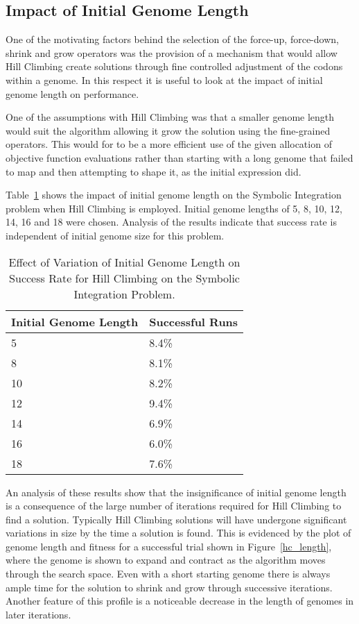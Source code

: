 \subsection{Impact of Initial Genome Length}
One of the motivating factors behind the selection of the force-up, force-down, shrink and grow operators was the provision of a mechanism that would allow Hill Climbing create solutions through fine controlled adjustment of the codons within a genome. In this respect it is useful to look at the impact of initial genome length on performance.
 
One of the assumptions with Hill Climbing was that a smaller genome length would suit the algorithm allowing it grow the solution using the fine-grained operators. This would for to be a more efficient use of the given allocation of objective function evaluations rather than starting with a long genome that failed to map and then attempting to shape it, as the initial expression did.

Table~\ref{hc_gl_table} shows the impact of initial genome length on the Symbolic Integration problem when Hill Climbing is employed. Initial genome lengths of 5, 8, 10, 12, 14, 16 and 18 were chosen. Analysis of the results indicate that success rate is independent of initial genome size for this problem. 

\begin{table}[h]
\begin{center}
\begin{tabular}{|l|l|}
\hline
Initial Genome Length & Successful Runs \\
\hline
5 & 8.4\% \\
8 & 8.1\% \\
10 & 8.2\% \\
12 & 9.4\% \\
14 & 6.9\% \\
16 & 6.0\% \\
18 & 7.6\% \\
\hline
\end{tabular}
\caption{\label{hc_gl_table} Effect of Variation of Initial Genome Length on Success Rate for Hill Climbing on the Symbolic Integration Problem.}
\end{center}
\end{table}

 An analysis of these results show that the insignificance of initial genome length is a consequence of the large number of iterations required for Hill Climbing to find a solution. Typically Hill Climbing solutions will have undergone significant variations in size by the time a solution is found.  
This is evidenced by the plot of genome length and fitness for a successful trial shown in Figure~\ref{hc_length}, where the genome is shown to expand and contract as the algorithm moves through the search space. Even with a short starting genome there is always ample time for the solution to shrink and grow through successive iterations. Another feature of this profile is a noticeable decrease in the length of genomes in later iterations.


